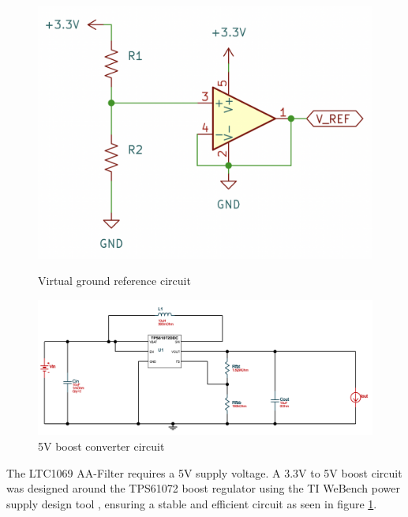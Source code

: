 \begin{figure}[H]
    \centering
    \begin{minipage}{0.35\textwidth}
        \centering
        \includegraphics[width=\textwidth]{Vground.png}
        \caption{\newline Virtual ground reference circuit}
        \label{fig:virtual_ground}
    \end{minipage}\hfill
    \begin{minipage}{0.6\textwidth}
        \centering
        \includegraphics[width=\textwidth]{5V_Reg.png}
        \caption{5V boost converter circuit}
        \label{fig:5V_reg}
    \end{minipage}
\end{figure}

The LTC1069 AA-Filter requires a 5V supply voltage. A 3.3V to 5V boost circuit was designed around the TPS61072 boost regulator using the TI WeBench power supply design tool \cite{WEBENCHCIRCUITDESIGNERDesignTool}, ensuring a stable and efficient circuit as seen in figure \ref{fig:5V_reg}. 

